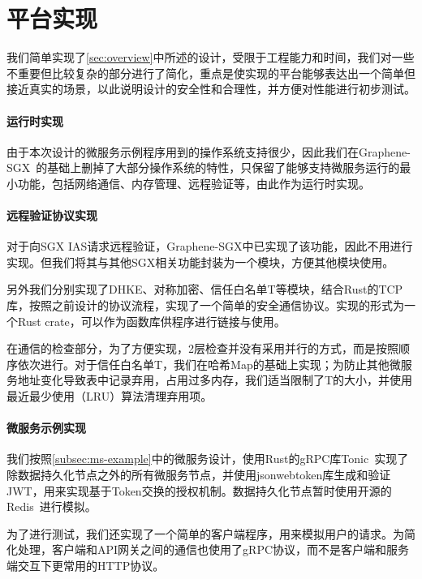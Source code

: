 \section{平台实现}\label{sec:implimentation}

我们简单实现了\cref{sec:overview}中所述的设计，受限于工程能力和时间，我们对一些不重要但比较复杂的部分进行了简化，重点是使实现的平台能够表达出一个简单但接近真实的场景，以此说明设计的安全性和合理性，并方便对性能进行初步测试。%

\paragraph{运行时实现}

由于本次设计的微服务示例程序用到的操作系统支持很少，因此我们在Graphene-SGX~\cite{tsai2017graphene}的基础上删掉了大部分操作系统的特性，只保留了能够支持微服务运行的最小功能，包括网络通信、内存管理、远程验证等，由此作为运行时实现。

\paragraph{远程验证协议实现}

对于向SGX IAS请求远程验证，Graphene-SGX中已实现了该功能，因此不用进行实现。但我们将其与其他SGX相关功能封装为一个模块，方便其他模块使用。

另外我们分别实现了DHKE、对称加密、信任白名单T等模块，结合Rust的TCP库，按照之前设计的协议流程，实现了一个简单的安全通信协议。实现的形式为一个Rust crate，可以作为函数库供程序进行链接与使用。

在通信的检查部分，为了方便实现，2层检查并没有采用并行的方式，而是按照顺序依次进行。对于信任白名单T，我们在哈希Map的基础上实现；为防止其他微服务地址变化导致表中记录弃用，占用过多内存，我们适当限制了T的大小，并使用最近最少使用（LRU）算法清理弃用项。

\paragraph{微服务示例实现}

我们按照\cref{subsec:ms-example}中的微服务设计，使用Rust的gRPC库Tonic~\cite{tonic}实现了除数据持久化节点之外的所有微服务节点，并使用jsonwebtoken库生成和验证JWT，用来实现基于Token交换的授权机制。数据持久化节点暂时使用开源的Redis~\cite{redis}进行模拟。

为了进行测试，我们还实现了一个简单的客户端程序，用来模拟用户的请求。为简化处理，客户端和API网关之间的通信也使用了gRPC协议，而不是客户端和服务端交互下更常用的HTTP协议。
